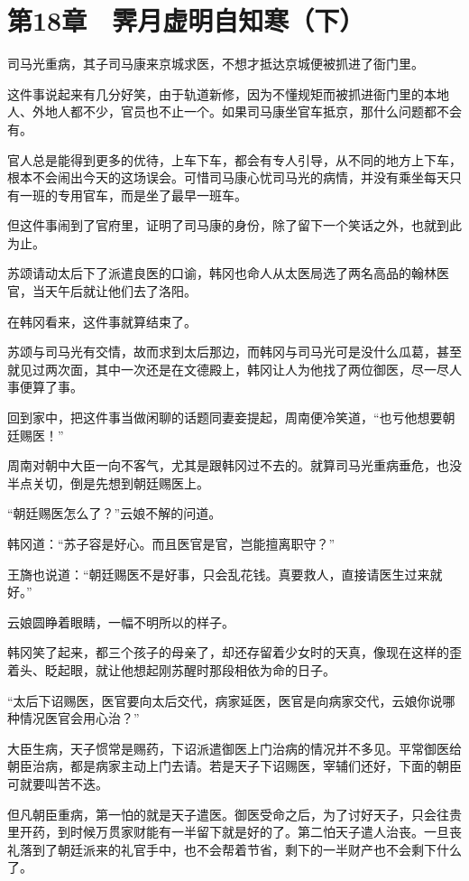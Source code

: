 \section{第18章　霁月虚明自知寒（下）}

司马光重病，其子司马康来京城求医，不想才抵达京城便被抓进了衙门里。

这件事说起来有几分好笑，由于轨道新修，因为不懂规矩而被抓进衙门里的本地人、外地人都不少，官员也不止一个。如果司马康坐官车抵京，那什么问题都不会有。

官人总是能得到更多的优待，上车下车，都会有专人引导，从不同的地方上下车，根本不会闹出今天的这场误会。可惜司马康心忧司马光的病情，并没有乘坐每天只有一班的专用官车，而是坐了最早一班车。

但这件事闹到了官府里，证明了司马康的身份，除了留下一个笑话之外，也就到此为止。

苏颂请动太后下了派遣良医的口谕，韩冈也命人从太医局选了两名高品的翰林医官，当天午后就让他们去了洛阳。

在韩冈看来，这件事就算结束了。

苏颂与司马光有交情，故而求到太后那边，而韩冈与司马光可是没什么瓜葛，甚至就见过两次面，其中一次还是在文德殿上，韩冈让人为他找了两位御医，尽一尽人事便算了事。

回到家中，把这件事当做闲聊的话题同妻妾提起，周南便冷笑道，“也亏他想要朝廷赐医！”

周南对朝中大臣一向不客气，尤其是跟韩冈过不去的。就算司马光重病垂危，也没半点关切，倒是先想到朝廷赐医上。

“朝廷赐医怎么了？”云娘不解的问道。

韩冈道：“苏子容是好心。而且医官是官，岂能擅离职守？”

王旖也说道：“朝廷赐医不是好事，只会乱花钱。真要救人，直接请医生过来就好。”

云娘圆睁着眼睛，一幅不明所以的样子。

韩冈笑了起来，都三个孩子的母亲了，却还存留着少女时的天真，像现在这样的歪着头、眨起眼，就让他想起刚苏醒时那段相依为命的日子。

“太后下诏赐医，医官要向太后交代，病家延医，医官是向病家交代，云娘你说哪种情况医官会用心治？”

大臣生病，天子惯常是赐药，下诏派遣御医上门治病的情况并不多见。平常御医给朝臣治病，都是病家主动上门去请。若是天子下诏赐医，宰辅们还好，下面的朝臣可就要叫苦不迭。

但凡朝臣重病，第一怕的就是天子遣医。御医受命之后，为了讨好天子，只会往贵里开药，到时候万贯家财能有一半留下就是好的了。第二怕天子遣人治丧。一旦丧礼落到了朝廷派来的礼官手中，也不会帮着节省，剩下的一半财产也不会剩下什么了。

